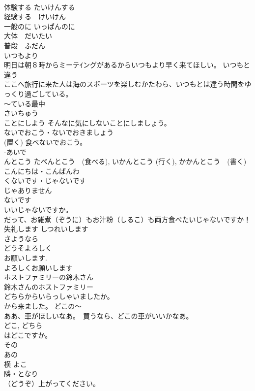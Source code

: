 \documentclass[8pt]{extreport}
\begin{document}
\begin{CJK}{UTF8}{min}
\\	体験する	たいけんする 
\\	経験する　けいけん 
\\	一般のに	いっぱんのに 
\\	大体　だいたい 
\\	普段　ふだん 
\\	いつもより
\\	明日は朝８時からミーテｲングがあるからいつもより早く来てほしい。 いつもと違う 
\\	ここへ旅行に来た人は海のスポーツを楽しむかたわら、いつもとは違う時間をゆっくり過ごしている。 
\\	～ている最中	
\\	さいちゅう 
\\	ことにしよう そんなに気にしないことにしましょう。 
\\	ないでおこう・ないでおきましょう 
\\	(置く) 食べないでおこう。 
\\	-あいで
\\	んとこう たべんとこう　(食べる), いかんとこう (行く), かかんとこう　(書く)
\\	こんにちは・こんばんわ	
\\	くないです・じゃないです	
\\	じゃありません 
\\	ないです 
\\	いいじゃないですか。 
\\	だって、お雑煮（ぞうに）もお汁粉（しるこ）も両方食べたいじゃないですか！ 
\\	失礼します	しつれいします 
\\	さようなら 
\\	どうそよろしく	
\\	お願いします. 
\\	よろしくお願いします 
\\	ホストファミリーの鈴木さん	
\\	鈴木さんのホストファミリー 
\\	どちらからいらっしゃいましたか。	
\\	から来ました。 どこの～ 
\\	ああ、車がほしいなあ。　買うなら、どこの車がいいかなあ。 
\\	どこ, どちら 
\\	はどこですか。
\\	その	
\\	あの 
\\	横	よこ 
\\	隣・となり 
\\	（どうぞ）上がってください。	

\end{CJK}
\end{document}
